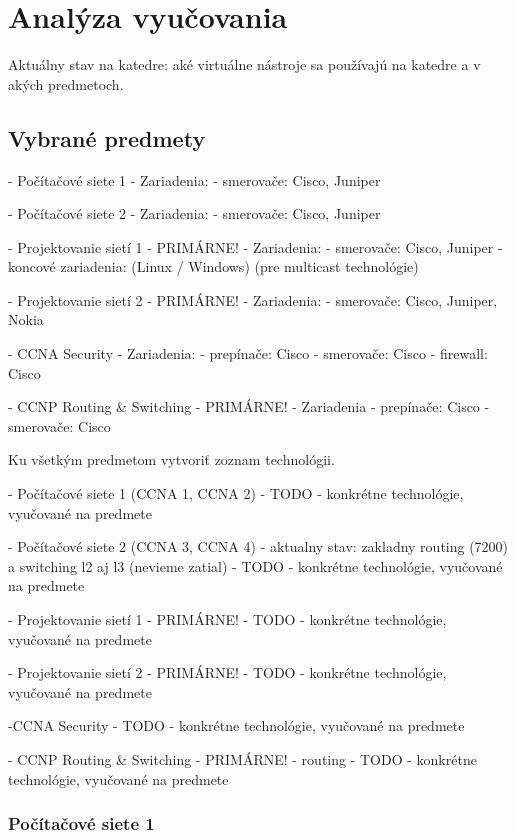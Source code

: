 \chapter{Analýza vyučovania}

Aktuálny stav na katedre: aké virtuálne nástroje sa používajú na katedre a v akých predmetoch.

\section{Vybrané predmety}

- Počítačové siete 1
  - Zariadenia:
    - smerovače: Cisco, Juniper

- Počítačové siete 2
  - Zariadenia:
    - smerovače: Cisco, Juniper

- Projektovanie sietí 1 - PRIMÁRNE!
  - Zariadenia:
    - smerovače: Cisco, Juniper
    - koncové zariadenia: (Linux / Windows) (pre multicast technológie)

- Projektovanie sietí 2 - PRIMÁRNE!
  - Zariadenia:
    - smerovače: Cisco, Juniper, Nokia

- CCNA Security
  - Zariadenia:
    - prepínače: Cisco
    - smerovače: Cisco
    - firewall: Cisco
                
- CCNP Routing \& Switching - PRIMÁRNE!
  - Zariadenia
    - prepínače: Cisco
    - smerovače: Cisco
    
    
    


Ku všetkým predmetom vytvoriť zoznam technológii.




- Počítačové siete 1 (CCNA 1, CCNA 2)
  - TODO - konkrétne technológie, vyučované na predmete

- Počítačové siete 2 (CCNA 3, CCNA 4)
  - aktualny stav: zakladny routing (7200) a switching l2 aj l3 (nevieme zatial)
  - TODO - konkrétne technológie, vyučované na predmete

- Projektovanie sietí 1 - PRIMÁRNE!
  - TODO - konkrétne technológie, vyučované na predmete

- Projektovanie sietí 2 - PRIMÁRNE!
  - TODO - konkrétne technológie, vyučované na predmete

-CCNA Security
  - TODO - konkrétne technológie, vyučované na predmete

- CCNP Routing \& Switching - PRIMÁRNE!
  - routing
  - TODO - konkrétne technológie, vyučované na predmete

\subsection{Počítačové siete 1}

